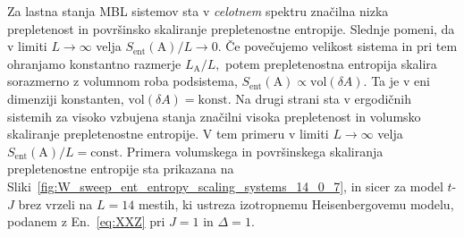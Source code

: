 Za lastna stanja MBL sistemov sta v \emph{celotnem} spektru značilna nizka prepletenost in površinsko skaliranje prepletenostne entropije. Slednje pomeni, da v limiti $L\to\infty$ velja $S_\mathrm{ent}(\mathrm{A})/L\to0$. Če povečujemo velikost sistema in pri tem ohranjamo konstantno razmerje $L_\mathrm{A}/L,$ potem prepletenostna entropija skalira sorazmerno z volumnom roba podsistema, $S_\mathrm{ent}(\mathrm{A})\propto\mathrm{vol}\left(\delta A\right).$ Ta je v eni dimenziji konstanten, $\mathrm{vol}\left(\delta A\right)=\mathrm{konst}.$ Na drugi strani sta v ergodičnih sistemih za visoko vzbujena stanja značilni visoka prepletenost in volumsko skaliranje prepletenostne entropije. V tem primeru v limiti $L\to\infty$ velja $S_\mathrm{ent}(\mathrm{A})/L=\mathrm{const.}$ Primera volumskega in površinskega skaliranja prepletenostne entropije sta prikazana na Sliki~\ref{fig:W_sweep_ent_entropy_scaling_systems_14_0_7}, in sicer za model $t$-$J$ brez vrzeli na $L=14$ mestih, ki ustreza izotropnemu Heisenbergovemu modelu, podanem z En.~\eqref{eq:XXZ} pri $J=1$ in $\Delta=1.$
